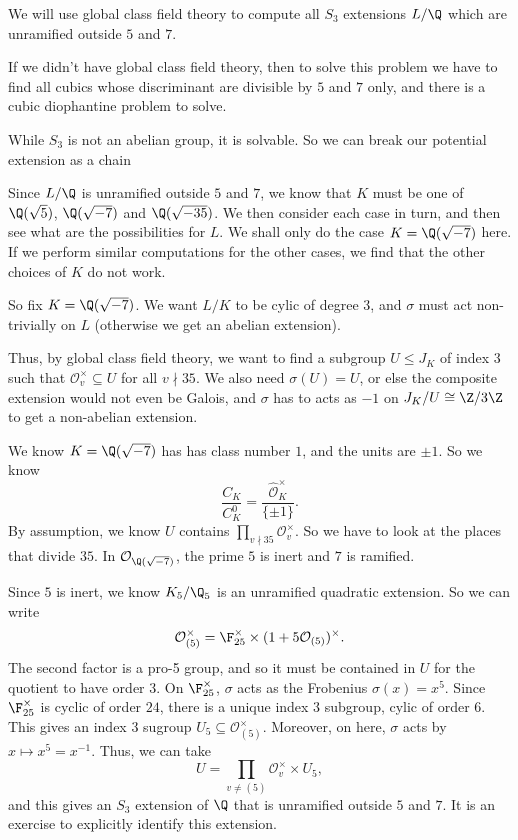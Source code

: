 \documentclass[a4paper]{article}
\begin{document}
\begin{eg}
  We will use global class field theory to compute all $S_3$ extensions $L/\Q$ which are unramified outside $5$ and $7$.

  If we didn't have global class field theory, then to solve this problem we have to find all cubics whose discriminant are divisible by $5$ and $7$ only, and there is a cubic diophantine problem to solve.

  While $S_3$ is not an abelian group, it is solvable. So we can break our potential extension as a chain
  \begin{center}
  \end{center}
  Since $L/\Q$ is unramified outside $5$ and $7$, we know that $K$ must be one of $\Q(\sqrt{5})$, $\Q(\sqrt{-7})$ and $\Q(\sqrt{-35})$. We then consider each case in turn, and then see what are the possibilities for $L$. We shall only do the case $K = \Q(\sqrt{-7})$ here. If we perform similar computations for the other cases, we find that the other choices of $K$ do not work.

  So fix $K = \Q(\sqrt{-7})$. We want $L/K$ to be cylic of degree $3$, and $\sigma$ must act non-trivially on $L$ (otherwise we get an abelian extension).

  Thus, by global class field theory, we want to find a subgroup $U \leq J_K$ of index $3$ such that $\mathcal{O}_v^\times \subseteq U$ for all $v \nmid 35$. We also need $\sigma(U) = U$, or else the composite extension would not even be Galois, and $\sigma$ has to acts as $-1$ on $J_K/U \cong \Z/3\Z$ to get a non-abelian extension.

  We know $K = \Q(\sqrt{-7})$ has has class number $1$, and the units are $\pm 1$. So we know
  \[
    \frac{C_K}{C_K^0} = \frac{\hat{\mathcal{O}}_K^\times}{\{\pm 1\}}.
  \]
  By assumption, we know $U$ contains $\prod_{v \nmid 35} \mathcal{O}_v^\times$. So we have to look at the places that divide $35$. In $\mathcal{O}_{\Q(\sqrt{-7})}$, the prime $5$ is inert and $7$ is ramified.

  Since $5$ is inert, we know $K_5/\Q_5$ is an unramified quadratic extension. So we can write
  \[
    \mathcal{O}_{(5)}^\times = \F_{25}^\times \times (1 + 5\mathcal{O}_{(5)})^\times.
  \]
  The second factor is a pro-5 group, and so it must be contained in $U$ for the quotient to have order $3$. On $\F_{25}^\times$, $\sigma$ acts as the Frobenius $\sigma(x) = x^5$. Since $\F_{25}^\times$ is cyclic of order $24$, there is a unique index $3$ subgroup, cylic of order $6$. This gives an index $3$ sugroup $U_5 \subseteq \mathcal{O}_{(5)}^\times$. Moreover, on here, $\sigma$ acts by $x \mapsto x^5 = x^{-1}$. Thus, we can take
  \[
    U = \prod_{v \not= (5)} \mathcal{O}_v^\times \times U_5,
  \]
  and this gives an $S_3$ extension of $\Q$ that is unramified outside $5$ and $7$. It is an exercise to explicitly identify this extension. %


\end{eg}
\end{document}
